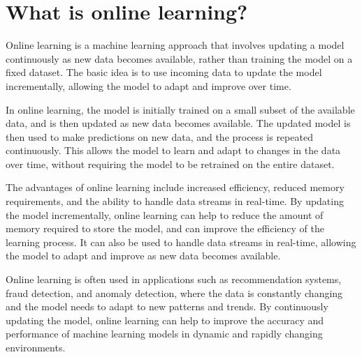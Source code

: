 \section{What is online learning?}
Online learning is a machine learning approach that involves updating a model continuously as new data becomes available, rather than training the model on a fixed dataset. The basic idea is to use incoming data to update the model incrementally, allowing the model to adapt and improve over time.

In online learning, the model is initially trained on a small subset of the available data, and is then updated as new data becomes available. The updated model is then used to make predictions on new data, and the process is repeated continuously. This allows the model to learn and adapt to changes in the data over time, without requiring the model to be retrained on the entire dataset.

The advantages of online learning include increased efficiency, reduced memory requirements, and the ability to handle data streams in real-time. By updating the model incrementally, online learning can help to reduce the amount of memory required to store the model, and can improve the efficiency of the learning process. It can also be used to handle data streams in real-time, allowing the model to adapt and improve as new data becomes available.

Online learning is often used in applications such as recommendation systems, fraud detection, and anomaly detection, where the data is constantly changing and the model needs to adapt to new patterns and trends. By continuously updating the model, online learning can help to improve the accuracy and performance of machine learning models in dynamic and rapidly changing environments.

